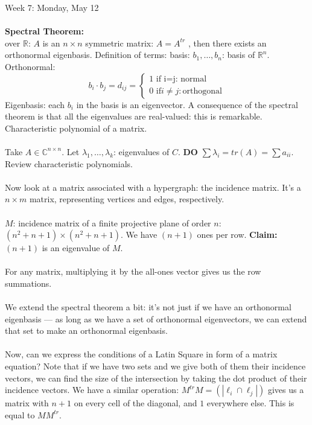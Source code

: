 \documentclass[12pt]{article}
\theoremstyle{remark}
\newcommand{\R}{\mathbb{R}}
\newcommand{\C}{\mathbb{C}}
\begin{document}
\begin{section}{Week 7: Monday, May 12}
\\\\
\textbf{Spectral Theorem:}
\\ over $\R$: $A$ is an $n \times n$ symmetric matrix: $A = A^{tr}$ , then there exists an orthonormal eigenbasis. Definition of terms: basis: $b_1,\ldots,b_n$: basis of $\R^n$. Orthonormal: $$b_i \cdot b_j = d_{ij} = \begin{cases}1 \text{ if i=j: normal} \\ 0 \text{ if} i \neq j : \text{orthogonal}\end{cases}$$ Eigenbasis: each $b_i$ in the basis is an eigenvector. A consequence of the spectral theorem is that all the eigenvalues are real-valued: this is remarkable. Characteristic polynomial of a matrix. 
\\\\
Take $A \in \C^{n \times n}$. Let $\lambda_1,\ldots,\lambda_k$: eigenvalues of $C$. \textbf{DO} $\sum \lambda_i = tr(A) = \sum a_{ii}$. Review characteristic polynomials.
\\\\
Now look at a matrix associated with a hypergraph: the incidence matrix. It's a $n \times m$ matrix, representing vertices and edges, respectively. 
\\\\
$M$: incidence matrix of a finite projective plane of order $n$: $(n^2 + n + 1) \times (n^2 + n + 1)$. We have $(n+1)$ ones per row. \textbf{Claim:} $(n+1)$ is an eigenvalue of $M$.
\\\\
For any matrix, multiplying it by the all-ones vector gives us the row summations.
\\\\
We extend the spectral theorem a bit: it's not just if we have an orthonormal eigenbasis --- as long as we have a set of orthonormal eigenvectors, we can extend that set to make an orthonormal eigenbasis.
\\\\
Now, can we express the conditions of a Latin Square in form of a matrix equation?
Note that if we have two sets and we give both of them their incidence vectors, we  can find the size of the intersection by taking the dot product of their incidence vectors. We have a similar operation: $M^{tr} M = (|\ell_i \cap \ell_j |)$ gives us a matrix with $n+1$ on every cell of the diagonal, and $1$ everywhere else. This is equal to $MM^{tr}$. 
\\\\

\end{section}
\end{document}

